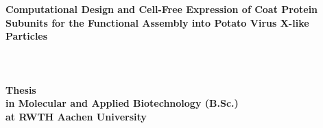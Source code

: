 \documentclass[12pt]{article}
\theoremstyle{definition}
\begin{document}
\begin{titlepage}
    \begin{figure}[t]
        
    \end{figure}
   \begin{center}
        \vspace*{1cm}
       \textbf{\huge Computational Design and Cell-Free Expression of Coat Protein Subunits for the Functional Assembly into Potato Virus X-like Particles}
       \paragraph{}$~~$\\
       \paragraph{}$~~$\\
       \paragraph{}$~~$\\
       \textbf{Thesis} \\ 
       \textbf{in Molecular and Applied Biotechnology (B.Sc.)} \\ 
       \textbf{at RWTH Aachen University}
       \paragraph{}$~~$\\
       \paragraph{}$~~$\\
       \paragraph{}$~~$\\
        \\
        \\
        \\
        \\
       \paragraph{}$~~$\\
            
   \end{center}
\end{titlepage}
\end{document}
